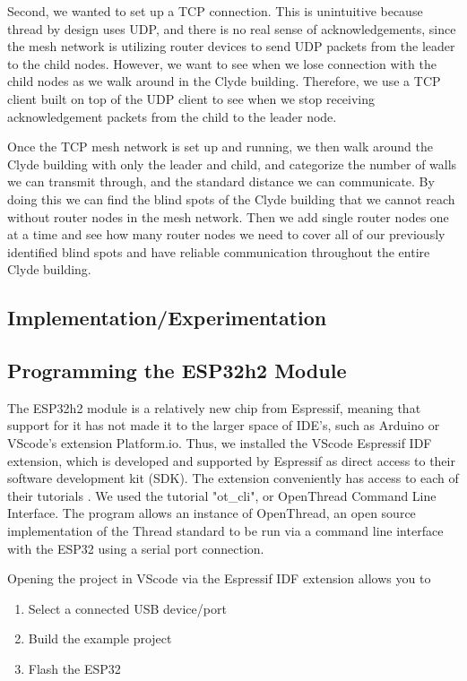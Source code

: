 \documentclass[letterpaper,twocolumn,10pt]{article}
\begin{document}
Second, we wanted to set up a TCP connection. This is unintuitive because thread by design uses UDP, and there is no real sense of acknowledgements, since the mesh network is utilizing router devices to send UDP packets from the leader to the child nodes. However, we want to see when we lose connection with the child nodes as we walk around in the Clyde building. Therefore, we use a TCP client built on top of the UDP client to see when we stop receiving acknowledgement packets from the child to the leader node. 

Once the TCP mesh network is set up and running, we then walk around the Clyde building with only the leader and child, and categorize the number of walls we can transmit through, and the standard distance we can communicate. By doing this we can find the blind spots of the Clyde building that we cannot reach without router nodes in the mesh network. Then we add single router nodes one at a time and see how many router nodes we need to cover all of our previously identified blind spots and have reliable communication throughout the entire Clyde building. 

\subsection*{Implementation/Experimentation}

\subsection{Programming the ESP32h2 Module}

The ESP32h2 module is a relatively new chip from Espressif, meaning that support for it has not made it to the larger space of IDE's, such as Arduino or VScode's extension Platform.io. Thus, we installed the VScode Espressif IDF extension, which is developed and supported by Espressif as direct access to their software development kit (SDK). The extension conveniently has access to each of their tutorials \cite*{Thread_tutorial_2}. We used the tutorial "ot\_cli", or OpenThread Command Line Interface. The program allows an instance of OpenThread, an open source implementation of the Thread standard to be run via a command line interface with the ESP32 using a serial port connection. 

Opening the project in VScode via the Espressif IDF extension allows you to 
\begin{enumerate}
    \item Select a connected USB device/port
    \item Build the example project
    \item Flash the ESP32
\end{enumerate}
\end{document}
